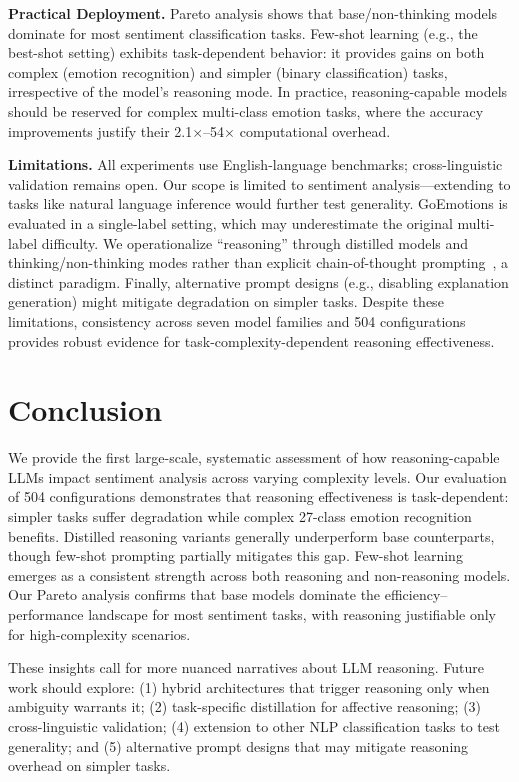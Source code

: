 \documentclass[runningheads]{llncs}
\begin{document}
\textbf{Practical Deployment.} Pareto analysis shows that base/non-thinking models dominate for most sentiment classification tasks. Few-shot learning (e.g., the best-shot setting) exhibits task-dependent behavior: it provides gains on both complex (emotion recognition) and simpler (binary classification) tasks, irrespective of the model’s reasoning mode.
In practice, reasoning-capable models should be reserved for complex multi-class emotion tasks, where the accuracy improvements justify their 2.1$\times$--54$\times$ computational overhead.

\textbf{Limitations.} All experiments use English-language benchmarks; cross-linguistic validation remains open. Our scope is limited to sentiment analysis---extending to tasks like natural language inference would further test generality. GoEmotions is evaluated in a single-label setting, which may underestimate the original multi-label difficulty. We operationalize ``reasoning'' through distilled models and thinking/non-thinking modes rather than explicit chain-of-thought prompting~\cite{wei2022chain}, a distinct paradigm. Finally, alternative prompt designs (e.g., disabling explanation generation) might mitigate degradation on simpler tasks. Despite these limitations, consistency across seven model families and 504 configurations provides robust evidence for task-complexity-dependent reasoning effectiveness.

\section{Conclusion}

We provide the first large-scale, systematic assessment of how reasoning-capable LLMs impact sentiment analysis across varying complexity levels. Our evaluation of 504 configurations demonstrates that reasoning effectiveness is task-dependent: simpler tasks suffer degradation while complex 27-class emotion recognition benefits. Distilled reasoning variants generally underperform base counterparts, though few-shot prompting partially mitigates this gap. Few-shot learning emerges as a consistent strength across both reasoning and non-reasoning models. Our Pareto analysis confirms that base models dominate the efficiency--performance landscape for most sentiment tasks, with reasoning justifiable only for high-complexity scenarios.

These insights call for more nuanced narratives about LLM reasoning. Future work should explore: (1) hybrid architectures that trigger reasoning only when ambiguity warrants it; (2) task-specific distillation for affective reasoning; (3) cross-linguistic validation; (4) extension to other NLP classification tasks to test generality; and (5) alternative prompt designs that may mitigate reasoning overhead on simpler tasks.



\end{document}
